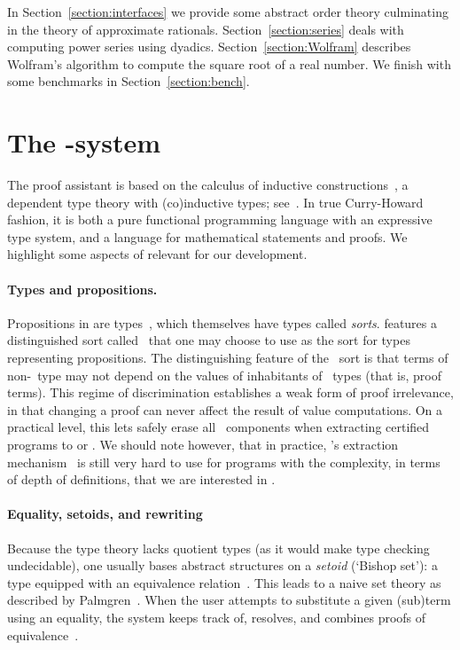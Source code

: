 \documentclass[a4paper,10pt,runningheads]{llncs}
\begin{document}
In Section~\ref{section:interfaces} we provide some abstract order theory culminating in the theory of approximate rationals. Section~\ref{section:series} deals with computing power series using dyadics. Section~\ref{section:Wolfram} describes Wolfram's algorithm to compute the square root of a real number. We finish with some benchmarks in Section~\ref{section:bench}.

\section{The \Coq-system}
The \Coq{} proof assistant is based on the calculus of inductive constructions~\cite{CoquandHuet,CoquandPaulin}, a dependent type theory with (co)inductive types; see~\cite{Coq,BC04}. In true Curry-Howard fashion, it is both a pure functional programming language with an expressive type system, and a language for mathematical statements and proofs. We highlight some aspects of \Coq{} relevant for our development.

\paragraph{Types and propositions.}
Propositions in \Coq{} are types~\cite{ITT,MartinLof:1982}, which themselves have types called \emph{sorts}. \Coq{} features a distinguished sort called \prop\ that one may choose to use as the sort for types representing propositions. The distinguishing feature of the \prop\ sort is that terms of non-\prop\ type may not depend on the values of inhabitants of \prop\ types (that is, proof terms). This regime of discrimination establishes a weak form of proof irrelevance, in that changing a proof can never affect the result of value computations. On a practical level, this lets \Coq{} safely erase all \prop\ components when extracting certified programs to \OCaml{} or \Haskell. We should note however, that in practice, \Coq's extraction mechanism~\cite{letouzey2008extraction} is still very hard to use for programs with the complexity, in terms of depth of definitions, that we are interested in \cite{cruzfilipe2003,cruzfilipe2006}.

\paragraph{Equality, setoids, and rewriting}
Because the \Coq{} type theory lacks quotient types (as it would make type checking undecidable), one usually bases abstract structures on a \emph{setoid} (`Bishop set'): a type equipped with an equivalence relation~\cite{Bishop67,Hofmann}. This leads to a naive set theory as described by Palmgren~\cite{palmgren2009constructivist}. When the user attempts to substitute a given (sub)term using an equality, the system keeps track of, resolves, and combines proofs of equivalence~\cite{Setoid-rewrite}.
\end{document}
